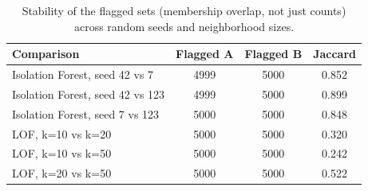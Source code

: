 \begin{table}[!t]
\caption{Stability of the flagged sets (membership overlap, not just counts) across random seeds and neighborhood sizes.}
\label{tab:ext_stability}
\centering
\setlength{\tabcolsep}{3pt}
\footnotesize
\begin{tabular}{lccc}
\hline
Comparison & Flagged A & Flagged B & Jaccard \\
\hline
Isolation Forest, seed 42 vs 7 & 4999 & 5000 & 0.852 \\
Isolation Forest, seed 42 vs 123 & 4999 & 5000 & 0.899 \\
Isolation Forest, seed 7 vs 123 & 5000 & 5000 & 0.848 \\
LOF, k=10 vs k=20 & 5000 & 5000 & 0.320 \\
LOF, k=10 vs k=50 & 5000 & 5000 & 0.242 \\
LOF, k=20 vs k=50 & 5000 & 5000 & 0.522 \\
\hline
\end{tabular}
\end{table}